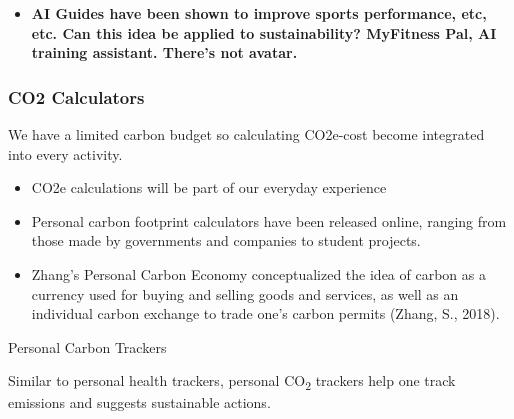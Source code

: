 \documentclass[
  letterpaper,
  DIV=11,
  numbers=noendperiod]{scrartcl}
\providecommand{\tightlist}{%
  \setlength{\itemsep}{0pt}\setlength{\parskip}{0pt}}\usepackage{longtable,booktabs,array}
\begin{document}
\begin{itemize}
\tightlist
\item
  \textbf{AI Guides have been shown to improve sports performance, etc,
  etc. Can this idea be applied to sustainability? MyFitness Pal, AI
  training assistant. There's not avatar.}
\end{itemize}

\subsubsection{CO2 Calculators}\label{co2-calculators}

We have a limited carbon budget so calculating CO2e-cost become
integrated into every activity.

\begin{itemize}
\item
  CO2e calculations will be part of our everyday experience
\item
  Personal carbon footprint calculators have been released online,
  ranging from those made by governments and companies to student
  projects.
\item
  Zhang's Personal Carbon Economy conceptualized the idea of carbon as a
  currency used for buying and selling goods and services, as well as an
  individual carbon exchange to trade one's carbon permits (Zhang, S.,
  2018).
\end{itemize}

Personal Carbon Trackers

Similar to personal health trackers, personal CO\textsubscript{2}
trackers help one track emissions and suggests sustainable actions.
\end{document}
